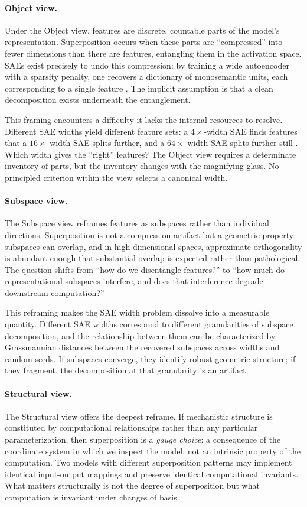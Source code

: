 \documentclass{article}
\begin{document}
\paragraph{Object view.}
Under the Object view, features are discrete, countable parts of the model's representation. Superposition occurs when these parts are ``compressed'' into fewer dimensions than there are features, entangling them in the activation space. SAEs exist precisely to undo this compression: by training a wide autoencoder with a sparsity penalty, one recovers a dictionary of monosemantic units, each corresponding to a single feature \citep{bricken2023}. The implicit assumption is that a clean decomposition exists underneath the entanglement.

This framing encounters a difficulty it lacks the internal resources to resolve. Different SAE widths yield different feature sets: a $4\times$-width SAE finds features that a $16\times$-width SAE splits further, and a $64\times$-width SAE splits further still \citep{templeton2024}. Which width gives the ``right'' features? The Object view requires a determinate inventory of parts, but the inventory changes with the magnifying glass. No principled criterion within the view selects a canonical width.

\paragraph{Subspace view.}
The Subspace view reframes features as subspaces rather than individual directions. Superposition is not a compression artifact but a geometric property: subspaces can overlap, and in high-dimensional spaces, approximate orthogonality is abundant enough that substantial overlap is expected rather than pathological. The question shifts from ``how do we disentangle features?'' to ``how much do representational subspaces interfere, and does that interference degrade downstream computation?''

This reframing makes the SAE width problem dissolve into a measurable quantity. Different SAE widths correspond to different granularities of subspace decomposition, and the relationship between them can be characterized by Grassmannian distances between the recovered subspaces across widths and random seeds. If subspaces converge, they identify robust geometric structure; if they fragment, the decomposition at that granularity is an artifact.

\paragraph{Structural view.}
The Structural view offers the deepest reframe. If mechanistic structure is constituted by computational relationships rather than any particular parameterization, then superposition is a \emph{gauge choice}: a consequence of the coordinate system in which we inspect the model, not an intrinsic property of the computation. Two models with different superposition patterns may implement identical input-output mappings and preserve identical computational invariants. What matters structurally is not the degree of superposition but what computation is invariant under changes of basis.
\end{document}
